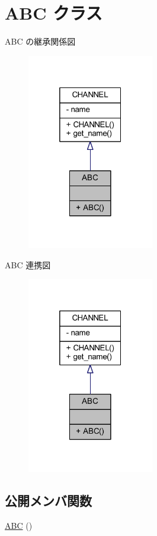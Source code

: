 \hypertarget{class_a_b_c}{}\section{A\+BC クラス}
\label{class_a_b_c}


A\+BC の継承関係図\nopagebreak
\begin{figure}[H]
\begin{center}
\leavevmode
\includegraphics[width=157pt]{class_a_b_c__inherit__graph}
\end{center}
\end{figure}


A\+BC 連携図\nopagebreak
\begin{figure}[H]
\begin{center}
\leavevmode
\includegraphics[width=157pt]{class_a_b_c__coll__graph}
\end{center}
\end{figure}
\subsection*{公開メンバ関数}
\begin{DoxyCompactItemize}
\item 
\hyperlink{class_a_b_c_a1bea7fc9f73e0d6878f9d2ac9ef3c1ec}{A\+BC} ()
\end{DoxyCompactItemize}


